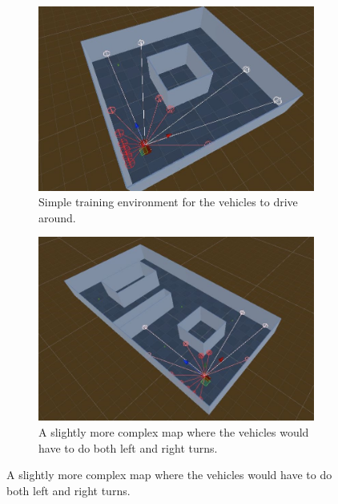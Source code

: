 \begin{figure}[!htbp] 
\centering
\begin{minipage}[t]{.45\textwidth}
\centering
\begin{subfigure}{\textwidth}
        \includegraphics[width=\linewidth, left]{06_Implementation/00_MLAgents/Images/MLMap1.JPG}
        \caption{Simple training environment for the vehicles to drive around.}
        \label{06:fig:MLMap1}
    \end{subfigure}
\end{minipage}
\qquad
\begin{minipage}[t]{.45\textwidth}
    \centering
    \begin{subfigure}{\textwidth}
        \includegraphics[width=\linewidth, right]{06_Implementation/00_MLAgents/Images/MLMap2.JPG}
        \caption{A slightly more complex map where the vehicles would have to do both left and right turns.}
        \label{06:fig:MLMap2}
    \end{subfigure}
\end{minipage}
\end{figure}

